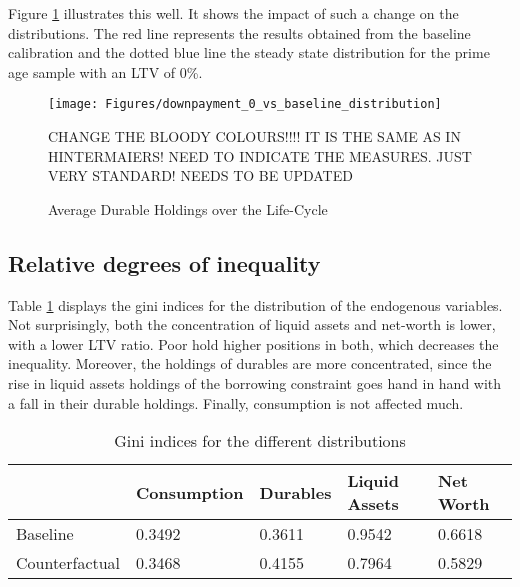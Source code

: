 \documentclass[a4paper,12pt,legno]{article}
\begin{document}
Figure \ref{downpayment_vs_baseline} illustrates this well. It shows the impact of such a change on the distributions. The red line represents the results obtained from the baseline calibration and the dotted blue line the steady state distribution for the prime age sample with an LTV of 0\%. 

\begin{figure}[!htbp]
\caption{Average Durable Holdings over the Life-Cycle} 
\label{downpayment_vs_baseline}	%
\centering
\texttt{[image: Figures/downpayment\_0\_vs\_baseline\_distribution]}  %

\begin{minipage}{0.8\linewidth}
\footnotesize{CHANGE THE BLOODY COLOURS!!!! IT IS THE SAME AS IN HINTERMAIERS! NEED TO INDICATE THE MEASURES. JUST VERY STANDARD! NEEDS TO BE UPDATED}
\end{minipage}

\end{figure}

\subsection{Relative degrees of inequality}
Table \ref{Gini_Ranking_counter_factual} displays the gini indices for the distribution of the endogenous variables. Not surprisingly, both the concentration of liquid assets and net-worth is lower, with a lower LTV ratio. Poor hold higher positions in both, which decreases the inequality. Moreover, the holdings of durables are more concentrated, since the rise in liquid assets holdings of the borrowing constraint goes hand in hand with a fall in their durable holdings. Finally, consumption is not affected much. 

\begin{table}[!htbp]
\centering
\caption{Gini indices for the different distributions}
\label{Gini_Ranking_counter_factual}
\begin{tabular}{@{}lllll@{}}
\toprule
      & Consumption & Durables & Liquid Assets & Net Worth \\ \midrule
Baseline & 0.3492       & 0.3611   & 0.9542        & 0.6618    \\ \midrule
Counterfactual  & 0.3468         & 0.4155     & 0.7964          & 0.5829      \\ \bottomrule
\end{tabular}
\end{table}
\end{document}
